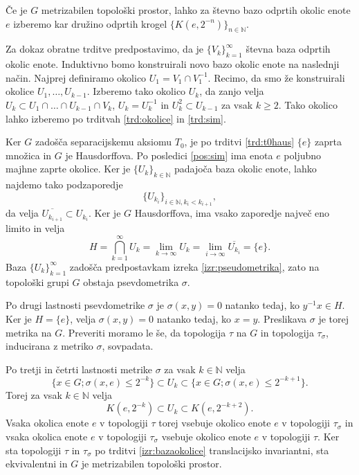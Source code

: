 \documentclass[mat1]{fmfdelo}
\newcommand{\N}{\mathbb N}
\newcommand{\closure}[1]{\overline{#1}}
\begin{document}
\begin{dokaz}
Če je $G$ metrizabilen topološki prostor, lahko za števno bazo odprtih okolic enote $e$ izberemo kar družino odprtih krogel $\lbrace K(e, 2^{-n}) \rbrace_{n \in \N}$.

Za dokaz obratne trditve predpostavimo, da je $\lbrace V_k \rbrace_{k = 1}^\infty$ števna baza odprtih okolic enote. Induktivno bomo konstruirali novo bazo okolic enote na naslednji način. Najprej definiramo okolico $U_1 = V_1 \cap V_1^{-1}$. Recimo, da smo že konstruirali okolice $U_1,\dots,U_{k-1}$. Izberemo tako okolico $U_k$, da zanjo velja $U_k \subset U_1 \cap \dots \cap U_{k-1}\cap V_k$, $U_k = U_k^{-1}$ in $U_k^2 \subset U_{k-1}$ za vsak $k \geq 2$. Tako okolico lahko izberemo po trditvah \ref{trd:okolice} in \ref{trd:sim}.

Ker $G$ zadošča separacijskemu aksiomu $T_0$, je po trditvi \ref{trd:t0haus} $\lbrace e \rbrace$ zaprta množica in $G$ je Hausdorffova. Po posledici \ref{pos:sim} ima enota $e$ poljubno majhne zaprte okolice. Ker je $\lbrace U_k \rbrace_{k \in \N}$ padajoča baza okolic enote, lahko najdemo tako podzaporedje \[\lbrace U_{k_i} \rbrace_{i \in \N, k_i < k_{i+1}},\] da velja $\closure{U_{k_{i+1}}} \subset U_{k_i}$. Ker je $G$ Hausdorffova, ima vsako zaporedje največ eno limito in velja
\[ H = \bigcap_{k=1}^\infty U_k = \lim_{k \to \infty}U_k = \lim_{i \to \infty} \closure{U_{k_i}} = \lbrace e \rbrace. \]
 Baza $\lbrace U_k \rbrace_{k = 1}^\infty$ zadošča predpostavkam izreka \ref{izr:pseudometrika}, zato na topološki grupi $G$ obstaja psevdometrika $\sigma$.

Po drugi lastnosti psevdometrike $\sigma$ je $\sigma(x, y) = 0$ natanko tedaj, ko $y^{-1}x \in H$. Ker je $H = \lbrace e \rbrace$, velja $\sigma(x, y) = 0$ natanko tedaj, ko $x = y$. Preslikava $\sigma$ je torej metrika na $G$. Preveriti moramo le še, da topologija $\tau$ na $G$ in topologija $\tau_\sigma$, inducirana z metriko $\sigma$, sovpadata.

Po tretji in četrti lastnosti metrike $\sigma$ za vsak $k \in \N$ velja
\[ \lbrace x \in G ; \sigma(x, e) \leq 2^{-k} \rbrace \subset U_k \subset \lbrace x \in G ; \sigma(x, e) \leq 2^{-k+1} \rbrace.\]
Torej za vsak $k \in \N$ velja
\[ K(e, 2^{-k}) \subset U_k \subset K(e, 2^{-k+2}). \]
Vsaka okolica enote $e$ v topologiji $\tau$ torej vsebuje okolico enote $e$ v topologiji $\tau_\sigma$ in vsaka okolica enote $e$ v topologiji $\tau_\sigma$ vsebuje okolico enote $e$ v topologiji $\tau$.
Ker sta topologiji $\tau$ in $\tau_\sigma$ po trditvi \ref{izr:bazaokolice} translacijsko invariantni, sta ekvivalentni in $G$ je metrizabilen topološki prostor.
\end{dokaz}
\end{document}
